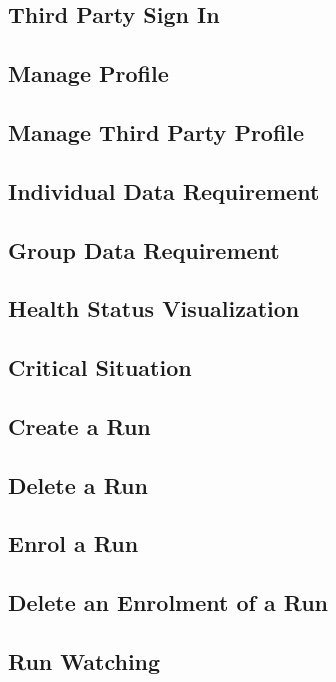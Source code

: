 \subsection{Third Party Sign In}

\clearpage

\subsection{Manage Profile}

\clearpage

\subsection{Manage Third Party Profile}

\clearpage

\subsection{Individual Data Requirement}

\clearpage

\subsection{Group Data Requirement}

\clearpage

\subsection{Health Status Visualization}

\clearpage

\subsection{Critical Situation}

\clearpage

\subsection{Create a Run}

\clearpage

\subsection{Delete a Run}

\clearpage

\subsection{Enrol a Run}

\clearpage

\subsection{Delete an Enrolment of a Run}

\clearpage

\subsection{Run Watching}

\clearpage
